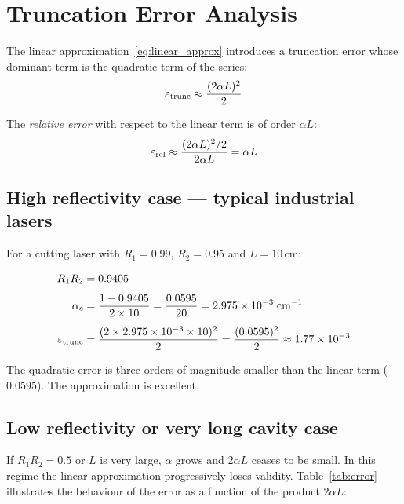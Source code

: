 \documentclass[12pt, a4paper]{article}
\begin{document}
\section{Truncation Error Analysis}

The linear approximation~\eqref{eq:linear_approx} introduces a truncation error whose
dominant term is the quadratic term of the series:
%
\begin{equation}
  \varepsilon_{\rm trunc} \approx \frac{(2\alpha L)^2}{2}
  \label{eq:error}
\end{equation}

The \textit{relative error} with respect to the linear term is of order $\alpha L$:
%
\begin{equation}
  \varepsilon_{\rm rel} \approx \frac{(2\alpha L)^2/2}{2\alpha L} = \alpha L
\end{equation}

\subsection{High reflectivity case — typical industrial lasers}

For a cutting laser with $R_1 = 0.99$, $R_2 = 0.95$ and $L = 10$\,cm:

\begin{align}
  R_1 R_2 &= 0.9405 \\[4pt]
  \alpha_c &= \frac{1 - 0.9405}{2 \times 10} = \frac{0.0595}{20}
            = 2.975 \times 10^{-3}\;\text{cm}^{-1} \\[4pt]
  \varepsilon_{\rm trunc} &= \frac{(2 \times 2.975\times10^{-3} \times 10)^2}{2}
                           = \frac{(0.0595)^2}{2} \approx 1.77 \times 10^{-3}
\end{align}

The quadratic error is three orders of magnitude smaller than the linear term ($0.0595$).
The approximation is excellent.

\subsection{Low reflectivity or very long cavity case}

If $R_1 R_2 = 0.5$ or $L$ is very large, $\alpha$ grows and $2\alpha L$ ceases to be small.
In this regime the linear approximation progressively loses validity.
Table~\ref{tab:error} illustrates the behaviour of the error as a function of the product
$2\alpha L$:
\end{document}
